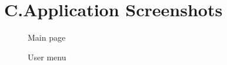 \documentclass[nochapterpage,nopartpage,noheadingspace,numbersubsubsec,bigchapter,colorback,accentcolor=tud9c,10pt]{tudreport}
\begin{document}

  \chapter*{C.\quad Application Screenshots}


        \begin{figure}
            \centering
            \caption{Main page}
            \label{fig:main-page}
        \end{figure}

        \begin{figure}
            \centering
            \caption{User menu}
            \label{fig:user-menu}
        \end{figure}
\end{document}
